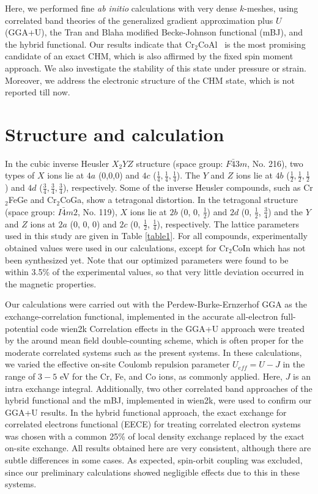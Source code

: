 \documentclass[preprint,5p]{elsarticle}
\newcommand{\cca}{Cr$_2$CoAl}
\begin{document}
Here, we performed fine {\it ab initio} calculations with very dense $k$-meshes,
using correlated band theories of the generalized gradient approximation 
plus $U$ (GGA+U),\cite{amf} the Tran and Blaha modified Becke-Johnson functional (mBJ),
\cite {mbj,comm}and the hybrid functional\cite{hybrid}.
Our results indicate that \cca~ is the most promising candidate
of an exact CHM, which is also affirmed by the fixed spin moment approach.\cite{fsm} 
We also investigate the stability of this state under pressure or strain.
Moreover, we address the electronic structure of the CHM state, 
which is not reported till now.




\section{Structure and calculation}
In the cubic inverse Heusler $X_2YZ$ structure (space group: $F\bar{4}3m$, No. 216), 
two types of $X$ ions lie at $4a$ (0,0,0)
and $4c$ ($\frac{1}{4},\frac{1}{4},\frac{1}{4}$).
The $Y$ and $Z$ ions lie at $4b$ ($\frac{1}{2},\frac{1}{2},\frac{1}{2}$) and 
 $4d$ ($\frac{3}{4},\frac{3}{4},\frac{3}{4}$), respectively.
Some of the inverse Heusler compounds, such as Cr$_2$FeGe and Cr$_2$CoGa, 
show a tetragonal distortion.
In the tetragonal structure (space group: $I\bar{4}m2$, No. 119),
$X$ ions lie at $2b$ (0, 0, $\frac{1}{2}$) and $2d$ (0, $\frac{1}{2}$, $\frac{3}{4}$)
and the $Y$ and $Z$ ions at $2a$ (0, 0, 0) and $2c$ (0, $\frac{1}{2}$, $\frac{1}{4}$), respectively.  
The lattice parameters used in this study are given in Table \ref{table1}.
For all compounds, experimentally obtained values were used in our calculations,
except for Cr$_2$CoIn which has not been synthesized yet.
Note that our optimized parameters were found to be within 3.5\% of the experimental values,
so that very little deviation occurred in the magnetic properties. 

Our calculations were carried out with the Perdew-Burke-Ernzerhof GGA 
as the exchange-correlation functional,
\cite{gga} implemented in the accurate all-electron full-potential code {\sc wien2k}\cite{wien2k,dft}
Correlation effects in the GGA+U approach were treated 
by the around mean field double-counting scheme,\cite{amf}
which is often proper for the moderate correlated systems 
such as the present systems.\cite{LP_nacoo}
In these calculations, we varied the effective on-site Coulomb repulsion parameter $U_{eff}=U-J$
in the range of $3-5$ eV for the Cr, Fe, and Co ions, as commonly applied.\cite{pdcro,srcro,sfro,lcmo,lco} 
Here, $J$ is an intra exchange integral.
Additionally, two other correlated band approaches of the hybrid functional\cite{hybrid} 
and the mBJ\cite{mbj}, implemented in {\sc wien2k}, were used to confirm our GGA+U results.
In the hybrid functional approach, the exact exchange for correlated electrons functional (EECE) 
for treating correlated electron systems was chosen with a common 25\% of local density
exchange replaced by the exact on-site exchange.\cite{ucd16}
All results obtained here are very consistent, 
although there are subtle differences in some cases.
As expected, spin-orbit coupling was excluded, 
since our preliminary calculations showed negligible effects due to this in these systems. 
\end{document}
